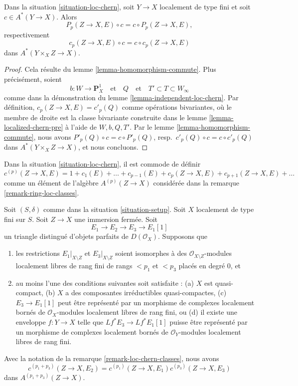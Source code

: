 \begin{lemma}
\label{lemma-loc-chern-classes-commute}
Dans la situation \ref{situation-loc-chern},
soit $Y \to X$ localement de type fini et soit $c \in A^*(Y \to X)$.
Alors
$$
P_p(Z \to X, E) \circ c = c \circ P_p(Z \to X, E),
$$
respectivement
$$
c_p(Z \to X, E) \circ c = c \circ c_p(Z \to X, E)
$$
dans $A^*(Y \times_X Z \to X)$.
\end{lemma}

\begin{proof}
Cela résulte du lemme \ref{lemma-homomorphism-commute}.
Plus précisément, soient
$$
b : W \to \mathbf{P}^1_X
\quad\text{et}\quad
Q
\quad\text{et}\quad
T' \subset T \subset W_\infty
$$
comme dans la démonstration du lemme \ref{lemma-independent-loc-chern}.
Par définition, $c_p(Z \to X, E) = c'_p(Q)$
comme opérations bivariantes,
où le membre de droite est la classe bivariante construite dans le
lemme \ref{lemma-localized-chern-pre} à l'aide de $W, b, Q, T'$.
Par le lemme \ref{lemma-homomorphism-commute}, nous avons
$P'_p(Q) \circ c = c \circ P'_p(Q)$, resp.\ $c'_p(Q) \circ c = c \circ c'_p(Q)$
dans $A^*(Y \times_X Z \to X)$, et nous concluons.
\end{proof}

\begin{remark}
\label{remark-loc-chern-classes}
Dans la situation \ref{situation-loc-chern}, il est commode de définir
$$
c^{(p)}(Z \to X, E) = 1 + c_1(E) + \ldots + c_{p - 1}(E) +
c_p(Z \to X, E) + c_{p + 1}(Z \to X, E) + \ldots
$$
comme un élément de l'algèbre $A^{(p)}(Z \to X)$ considérée dans la
remarque \ref{remark-ring-loc-classes}.
\end{remark}

\begin{lemma}
\label{lemma-additivity-loc-chern-c}
Soit $(S, \delta)$ comme dans la situation \ref{situation-setup}.
Soit $X$ localement de type fini sur $S$. Soit $Z \to X$
une immersion fermée. Soit
$$
E_1 \to E_2 \to E_3 \to E_1[1]
$$
un triangle distingué d'objets parfaits de $D(\mathcal{O}_X)$.
Supposons que
\begin{enumerate}
\item les restrictions $E_1|_{X \setminus Z}$ et $E_3|_{X \setminus Z}$
soient isomorphes à des $\mathcal{O}_{X \setminus Z}$-modules localement libres de rang fini
de rangs $< p_1$ et $< p_3$ placés en degré $0$, et
\item au moins l'une des conditions suivantes soit satisfaite :
(a) $X$ est quasi-compact,
(b) $X$ a des composantes irréductibles quasi-compactes,
(c) $E_3 \to E_1[1]$ peut être représenté par un morphisme de complexes
localement bornés de $\mathcal{O}_X$-modules localement libres de rang fini, ou
(d) il existe une enveloppe $f : Y \to X$ telle que $Lf^*E_3 \to Lf^*E_1[1]$
puisse être représenté par un morphisme de complexes localement bornés de
$\mathcal{O}_Y$-modules localement libres de rang fini.
\end{enumerate}
Avec la notation de la remarque \ref{remark-loc-chern-classes}, nous avons
$$
c^{(p_1 + p_3)}(Z \to X, E_2) = c^{(p_1)}(Z \to X, E_1)c^{(p_3)}(Z \to X, E_3)
$$
dans $A^{(p_1 + p_3)}(Z \to X)$.
\end{lemma}

